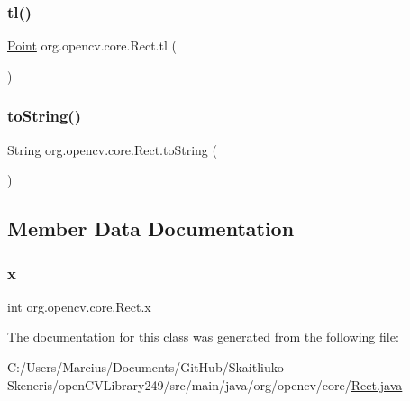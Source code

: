 \subsubsection{\texorpdfstring{tl()}{tl()}}
{\footnotesize\ttfamily \mbox{\hyperlink{classorg_1_1opencv_1_1core_1_1_point}{Point}} org.\+opencv.\+core.\+Rect.\+tl (\begin{DoxyParamCaption}{ }\end{DoxyParamCaption})}

\mbox{\label{classorg_1_1opencv_1_1core_1_1_rect_a57d61542ecbc32a270f93b4b120699fe}} 
\subsubsection{\texorpdfstring{to\+String()}{toString()}}
{\footnotesize\ttfamily String org.\+opencv.\+core.\+Rect.\+to\+String (\begin{DoxyParamCaption}{ }\end{DoxyParamCaption})}



\subsection{Member Data Documentation}
\mbox{\label{classorg_1_1opencv_1_1core_1_1_rect_a44cd51a7947e8371834a5e0c53b1c1fc}} 
\subsubsection{\texorpdfstring{x}{x}}
{\footnotesize\ttfamily int org.\+opencv.\+core.\+Rect.\+x}



The documentation for this class was generated from the following file\+:\begin{DoxyCompactItemize}
\item 
C\+:/\+Users/\+Marcius/\+Documents/\+Git\+Hub/\+Skaitliuko-\/\+Skeneris/open\+C\+V\+Library249/src/main/java/org/opencv/core/\mbox{\hyperlink{_rect_8java}{Rect.\+java}}\end{DoxyCompactItemize}
